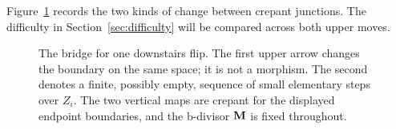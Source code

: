 Figure~\ref{fig:terminal-bridge} records the two kinds of change between
crepant junctions.  The difficulty in Section~\ref{sec:difficulty} will
be compared across both upper moves.
\begin{figure}[ht]
\centering
{}
\caption{The bridge for one downstairs flip.  The first upper arrow changes
the boundary on the same space; it is not a morphism.  The second denotes a
finite, possibly empty, sequence of small elementary steps over $Z_i$.
The two vertical maps are crepant for the displayed endpoint boundaries,
and the b-divisor $\mathbf{M}$ is fixed throughout.}
\label{fig:terminal-bridge}
\end{figure}

